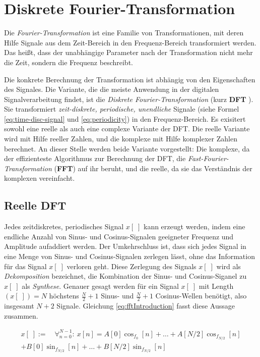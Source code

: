 \section{Diskrete Fourier-Transformation}

Die \emph{Fourier-Transformation} ist eine Familie von Transformationen, mit deren Hilfe Signale aus dem Zeit-Bereich in den Frequenz-Bereich transformiert werden. Das heißt, dass der unabhängige Parameter nach der Transformation nicht mehr die Zeit, sondern die Frequenz beschreibt. 

Die konkrete Berechnung der Transformation ist abhängig von den Eigenschaften des Signales. Die Variante, die die meiste Anwendung in der digitalen Signalverarbeitung findet, ist die \emph{Diskrete Fourier-Transformation} (kurz \textbf{DFT} ). Sie transformiert \emph{zeit-diskrete, periodische, unendliche} Signale (siehe Formel \ref{eq:time-disc-signal} und \ref{eq:periodicity}) in den Frequenz-Bereich. Es exisitert sowohl eine reelle als auch eine complexe Variante der DFT. Die reelle Variante wird mit Hilfe reeller Zahlen, und die komplexe mit Hilfe komplexer Zahlen berechnet. An dieser Stelle werden beide Variante vorgestellt: Die komplexe, da der effizienteste Algorithmus zur Berechnung der DFT, die \emph{Fast-Fourier-Transformation} (\textbf{FFT}) auf ihr beruht, und die reelle, da sie das Verständnis der komplexen vereinfacht.\cite[S. 142 - 146]{dspGuide}

\subsection{Reelle DFT}
\label{sec:realDFT}

Jedes zeitdiskretes, periodisches Signal $x[\;]$ kann erzeugt werden, indem eine endliche Anzahl von Sinus- und Cosinus-Signalen geeigneter Frequenz und Amplitude aufaddiert werden. Der Umkehrschluss ist, dass sich jedes Signal in eine Menge von Sinus- und Cosinus-Signalen zerlegen lässt, ohne das Information für das Signal $x[\;]$ verloren geht. Diese Zerlegung des Signals $x[\;]$ wird als \emph{Dekomposition} bezeichnet, die Kombination der Sinus- und Cosinus-Siganel zu $x[\;]$ als \emph{Synthese}. Genauer gesagt werden für ein Signal $x[\;]$ mit Length$(x[\;]) = N$ höchstens $\frac{N}{2}+1$ Sinus- und $\frac{N}{2}+1$ Cosinus-Wellen benötigt, also insgesamt $N+2$ Signale. Gleichung \ref{eq:fftIntroduction} fasst diese Aussage zusammen. \cite[S. 144 - 147 ]{dspGuide}

\begin{equation}
\label{eq:fftIntroduction}
\begin{split}
x[\;] := \quad \mathop{\forall}_{n = 0}^{N-1} :\ x[n] =  A[0]\cos_{f_0}[n] + \ldots + A[N/2]\cos_{f_{N/2}}[n]  \\ + B[0]\sin_{f_{N/2}}[n] + \ldots + B[N/2] \sin_{f_{N/2}}[n]
\end{split}
\end{equation}



